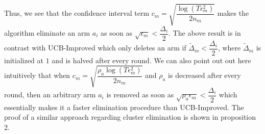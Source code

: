 \begin{remark}
	Thus, we see that the confidence interval term $c_{m}=\sqrt{\dfrac{\log (T\epsilon_{m}^{2})}{2 n_{m}}}$ makes the algorithm eliminate an arm $a_{i}$ as soon as $\sqrt{\epsilon_{m}}<\dfrac{\Delta_{i}}{2}$. The above result is in contrast with UCB-Improved which only deletes an arm if $\tilde{\Delta}_{m}<\dfrac{\Delta_{i}}{2}$, where $\tilde{\Delta}_{m}$ is initialized at $1$ and is halved after every round. We can also point out out here intuitively that when $c_{m}=\sqrt{\dfrac{\rho_{a}\log (T\epsilon_{m}^{2})}{2 n_{m}}}$ and $\rho_{a}$ is decreased after every round, then an arbitrary arm $a_{i}$ is removed as soon as  $\sqrt{\rho_{a}\epsilon_{m}}<\dfrac{\Delta_{i}}{2}$ which essentially makes it a faster elimination procedure than UCB-Improved. The proof of a similar approach regarding cluster elimination is shown in proposition 2.
%
%
%
%
%	

\end{remark}

